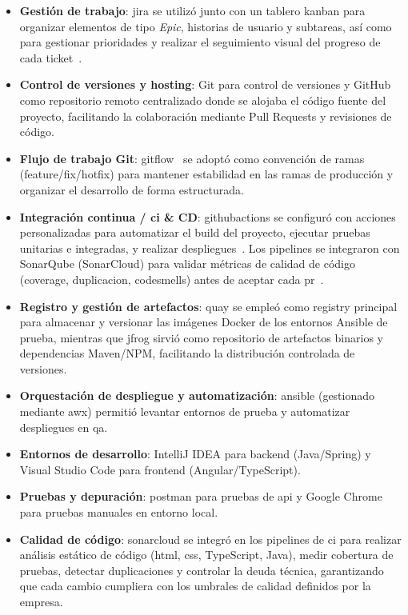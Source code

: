 \documentclass[11pt,a4paper,titlepage,oneside]{report}
\begin{document}
\begin{itemize}
  \item \textbf{Gestión de trabajo}: \gls{jira} se utilizó junto con un tablero \gls{kanban} para organizar elementos de tipo \textit{Epic}, historias de usuario y subtareas, así como para gestionar prioridades y realizar el seguimiento visual del progreso de cada ticket~\cite{JiraDocs}.
  \item \textbf{Control de versiones y hosting}: Git para control de versiones y GitHub como repositorio remoto centralizado donde se alojaba el código fuente del proyecto, facilitando la colaboración mediante Pull Requests y revisiones de código.
  \item \textbf{Flujo de trabajo Git}: \gls{gitflow}~\cite{Gitflow} se adoptó como convención de ramas (feature/fix/hotfix) para mantener estabilidad en las ramas de producción y organizar el desarrollo de forma estructurada.
  \item \textbf{Integración continua / \acrshort{ci} \& CD}: \gls{githubactions} se configuró con acciones personalizadas para automatizar el build del proyecto, ejecutar pruebas unitarias e integradas, y realizar despliegues~\cite{GitHubActionsDocs}. Los pipelines se integraron con SonarQube (SonarCloud) para validar métricas de calidad de código (\gls{coverage}, \gls{duplicacion}, \gls{codesmells}) antes de aceptar cada \acrshort{pr}~\cite{SonarQubeDocs}.
  \item \textbf{Registro y gestión de artefactos}: \gls{quay} se empleó como registry principal para almacenar y versionar las imágenes Docker de los entornos Ansible de prueba, mientras que \gls{jfrog} sirvió como repositorio de artefactos binarios y dependencias Maven/NPM, facilitando la distribución controlada de versiones.
  \item \textbf{Orquestación de despliegue y automatización}: \gls{ansible} (gestionado mediante \acrshort{awx}) permitió levantar entornos de prueba y automatizar despliegues en \acrshort{qa}.
  \item \textbf{Entornos de desarrollo}: IntelliJ IDEA para backend (Java/Spring) y Visual Studio Code para frontend (Angular/TypeScript).
  \item \textbf{Pruebas y depuración}: \gls{postman} para pruebas de \acrshort{api} y Google Chrome para pruebas manuales en entorno local.
  \item \textbf{Calidad de código}: \gls{sonarcloud} se integró en los pipelines de \acrshort{ci} para realizar análisis estático de código (\acrshort{html}, \acrshort{css}, TypeScript, Java), medir cobertura de pruebas, detectar duplicaciones y controlar la deuda técnica, garantizando que cada cambio cumpliera con los umbrales de calidad definidos por la empresa.
\end{itemize}
\end{document}
